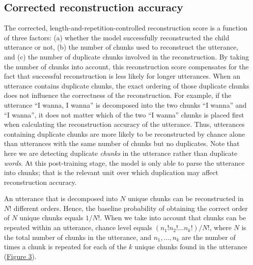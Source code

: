 \documentclass[
  english,
  man,mask,floatsintext]{apa6}
\begin{document}
\hypertarget{corrected-reconstruction-accuracy}{%
\subsection{Corrected reconstruction accuracy}\label{corrected-reconstruction-accuracy}}

The corrected, length-and-repetition-controlled reconstruction score is a function of three factors: (a) whether the model successfully reconstructed the child utterance or not, (b) the number of chunks used to reconstruct the utterance, and (c) the number of duplicate chunks involved in the reconstruction. By taking the number of chunks into account, this reconstruction score compensates for the fact that successful reconstruction is less likely for longer utterances. When an utterance contains duplicate chunks, the exact ordering of those duplicate chunks does not influence the correctness of the reconstruction. For example, if the utterance \enquote{I wanna, I wanna} is decomposed into the two chunks \enquote{I wanna} and \enquote{I wanna}, it does not matter which of the two \enquote{I wanna} chunks is placed first when calculating the reconstruction accuracy of the utterance. Thus, utterances containing duplicate chunks are more likely to be reconstructed by chance alone than utterances with the same number of chunks but no duplicates. Note that here we are detecting duplicate \emph{chunks} in the utterance rather than duplicate \emph{words}. At this post-training stage, the model is only able to parse the utterance into chunks; that is the relevant unit over which duplication may affect reconstruction accuracy.

An utterance that is decomposed into \(N\) unique chunks can be reconstructed in \(N!\) different orders. Hence, the baseline probability of obtaining the correct order of \(N\) unique chunks equals \(1/N!\). When we take into account that chunks can be repeated within an utterance, chance level equals \((n_1!n_2!\ldots n_k!)/N!\), where \(N\) is the total number of chunks in the utterance, and \(n_1,\ldots,n_k\) are the number of times a chunk is repeated for each of the \(k\) unique chunks found in the utterance (\protect\hyperlink{fig3}{Figure 3}).
\end{document}
